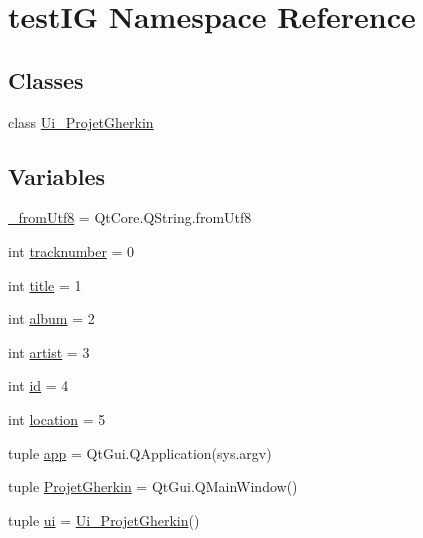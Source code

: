 \hypertarget{namespacetestIG}{
\section{testIG Namespace Reference}
\label{namespacetestIG}
}
\subsection*{Classes}
\begin{DoxyCompactItemize}
\item 
class \hyperlink{classtestIG_1_1Ui__ProjetGherkin}{Ui\_\-ProjetGherkin}
\end{DoxyCompactItemize}
\subsection*{Variables}
\begin{DoxyCompactItemize}
\item 
\hyperlink{namespacetestIG_a2d98915bee32d38cdcf4b3d9ff99717b}{\_\-fromUtf8} = QtCore.QString.fromUtf8
\item 
int \hyperlink{namespacetestIG_aa789580a63cc2a57bd7acfe5c8bb71b1}{tracknumber} = 0
\item 
int \hyperlink{namespacetestIG_aa2f01d25063e0d8fe853d858acbf1b6d}{title} = 1
\item 
int \hyperlink{namespacetestIG_afe23cfaeea66a3176b261346c34d257b}{album} = 2
\item 
int \hyperlink{namespacetestIG_ac2f48095bbe8837d1ef447d789e1cfb9}{artist} = 3
\item 
int \hyperlink{namespacetestIG_a73bd609aed9cb4e7b114472458d4a231}{id} = 4
\item 
int \hyperlink{namespacetestIG_a5e7314a258b3a05057454cc56cd727e3}{location} = 5
\item 
tuple \hyperlink{namespacetestIG_a00d42e6b6e4421bdaec1f45a7479a99b}{app} = QtGui.QApplication(sys.argv)
\item 
tuple \hyperlink{namespacetestIG_adba3aa3a2d00ebea0a8188c4b79bcb59}{ProjetGherkin} = QtGui.QMainWindow()
\item 
tuple \hyperlink{namespacetestIG_ab7ec909c09b6b583e68b8b63657605d7}{ui} = \hyperlink{classtestIG_1_1Ui__ProjetGherkin}{Ui\_\-ProjetGherkin}()
\end{DoxyCompactItemize}


